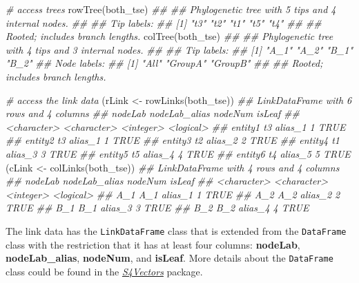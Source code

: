\documentclass[]{article}
\newcommand{\hlstr}[1]{\textcolor[rgb]{0.251,0.627,0.251}{#1}}%
\newcommand{\hlcom}[1]{\textcolor[rgb]{0.502,0.502,0.502}{\textit{#1}}}%
\newcommand{\hlstd}[1]{\textcolor[rgb]{0.251,0.251,0.251}{#1}}%
\newcommand{\hlkwd}[1]{\textcolor[rgb]{0.878,0.439,0.125}{#1}}%
\newenvironment{Shaded}{\begin{myshaded}}{\end{myshaded}}
\newcommand{\KeywordTok}[1]{\hlkwd{#1}}
\newcommand{\StringTok}[1]{\hlstr{#1}}
\newcommand{\CommentTok}[1]{\hlcom{#1}}
\newcommand{\NormalTok}[1]{\hlstd{#1}}
\begin{document}
\begin{Shaded}
\begin{Highlighting}[]
\CommentTok{# access trees}
\KeywordTok{rowTree}\NormalTok{(both_tse)}
\CommentTok{## }
\CommentTok{## Phylogenetic tree with 5 tips and 4 internal nodes.}
\CommentTok{## }
\CommentTok{## Tip labels:}
\CommentTok{## [1] "t3" "t2" "t1" "t5" "t4"}
\CommentTok{## }
\CommentTok{## Rooted; includes branch lengths.}
\KeywordTok{colTree}\NormalTok{(both_tse)}
\CommentTok{## }
\CommentTok{## Phylogenetic tree with 4 tips and 3 internal nodes.}
\CommentTok{## }
\CommentTok{## Tip labels:}
\CommentTok{## [1] "A_1" "A_2" "B_1" "B_2"}
\CommentTok{## Node labels:}
\CommentTok{## [1] "All"    "GroupA" "GroupB"}
\CommentTok{## }
\CommentTok{## Rooted; includes branch lengths.}
\end{Highlighting}
\end{Shaded}

\begin{Shaded}
\begin{Highlighting}[]
\CommentTok{# access the link data}
\NormalTok{(rLink <-}\StringTok{ }\KeywordTok{rowLinks}\NormalTok{(both_tse))}
\CommentTok{## LinkDataFrame with 6 rows and 4 columns}
\CommentTok{##             nodeLab nodeLab_alias   nodeNum    isLeaf}
\CommentTok{##         <character>   <character> <integer> <logical>}
\CommentTok{## entity1          t3       alias_1         1      TRUE}
\CommentTok{## entity2          t3       alias_1         1      TRUE}
\CommentTok{## entity3          t2       alias_2         2      TRUE}
\CommentTok{## entity4          t1       alias_3         3      TRUE}
\CommentTok{## entity5          t5       alias_4         4      TRUE}
\CommentTok{## entity6          t4       alias_5         5      TRUE}
\NormalTok{(cLink <-}\StringTok{ }\KeywordTok{colLinks}\NormalTok{(both_tse))}
\CommentTok{## LinkDataFrame with 4 rows and 4 columns}
\CommentTok{##         nodeLab nodeLab_alias   nodeNum    isLeaf}
\CommentTok{##     <character>   <character> <integer> <logical>}
\CommentTok{## A_1         A_1       alias_1         1      TRUE}
\CommentTok{## A_2         A_2       alias_2         2      TRUE}
\CommentTok{## B_1         B_1       alias_3         3      TRUE}
\CommentTok{## B_2         B_2       alias_4         4      TRUE}
\end{Highlighting}
\end{Shaded}

The link data has the \texttt{LinkDataFrame} class that is extended from the \texttt{DataFrame} class with the restriction that it has at least four columns:
\textbf{nodeLab}, \textbf{nodeLab\_alias}, \textbf{nodeNum}, and \textbf{isLeaf}. More details about
the \texttt{DataFrame} class could be found in the \emph{\href{https://bioconductor.org/packages/3.11/S4Vectors}{S4Vectors}} package.
\end{document}
